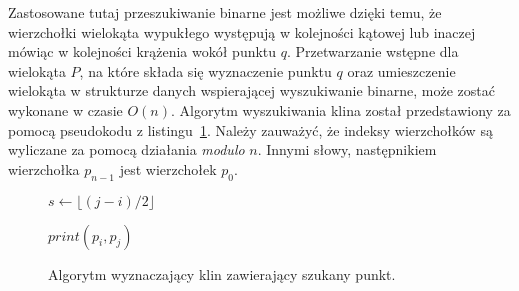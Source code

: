 




Zastosowane tutaj przeszukiwanie binarne jest możliwe dzięki temu, że
wierzchołki wielokąta wypukłego występują w kolejności kątowej lub
inaczej mówiąc w kolejności krążenia wokół punktu $q$. Przetwarzanie
wstępne dla wielokąta $P$, na które składa się wyznaczenie punktu $q$
oraz umieszczenie wielokąta w strukturze danych wspierającej
wyszukiwanie binarne, może zostać wykonane w czasie $O(n)$. Algorytm
wyszukiwania klina został przedstawiony za pomocą pseudokodu z
listingu~\ref{alg:findwedge}. Należy zauważyć, że indeksy wierzchołków
są wyliczane za pomocą działania \emph{modulo} $n$. Innymi słowy,
następnikiem wierzchołka $p_{n-1}$ jest wierzchołek $p_0$.


\begin{figure}[htp]
  \begin{algorithmic}[1]


    \State

    \Else
    \EndIf

    \State

        \State $s \gets \lfloor (j-i)/2 \rfloor$

        \State

        \Else
        \EndIf
    \EndWhile

    \State

    \State $print(p_i, p_j)$

    \EndProcedure

    \end{algorithmic}
    \caption{Algorytm wyznaczający klin zawierający szukany
      punkt.\label{alg:findwedge}}
  \end{figure}

